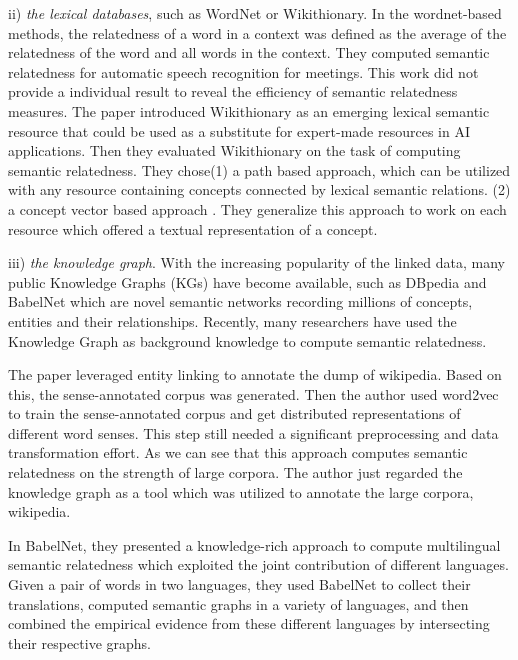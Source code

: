 ii) \emph{the lexical databases}, such as WordNet or Wikithionary. 
In the wordnet-based methods\cite{acl/Pucher07}, the relatedness of a word in a context was
defined as the average of the relatedness of the word and all words in the context. They computed
semantic relatedness for automatic speech recognition for meetings. This work did not provide a individual result
to reveal the efficiency of semantic relatedness measures.
The paper \cite{aaai/ZeschMG08} introduced Wikithionary as an emerging lexical semantic resource
that could be used as a substitute for expert-made resources in AI applications.
Then they evaluated Wikithionary on the task of computing semantic relatedness.
They chose(1) a path based approach\cite{its/Rada89}, which can be utilized with any
resource containing concepts connected by lexical semantic relations. (2) a concept vector based approach
\cite{ijcai/GabrilovichM07}. They generalize this approach to work on each
resource which offered a textual representation of a concept.

iii) \emph{the knowledge graph}. 
With the increasing popularity of the linked data, many public Knowledge Graphs (KGs) have
become available, such as DBpedia and BabelNet which are novel semantic networks recording millions
of concepts, entities and their relationships. Recently, many researchers have used the Knowledge Graph as
background knowledge to compute semantic relatedness. 

The paper\cite{acl/IacobacciPN15} leveraged entity linking to annotate the dump of wikipedia. Based on this,
the sense-annotated corpus was generated. Then the author used word2vec to
train the sense-annotated corpus and get distributed representations of different 
word senses. This step still needed a significant preprocessing and data transformation effort. 
As we can see that this approach computes semantic relatedness on the strength of large corpora.
The author just regarded the knowledge graph as a tool which was utilized to annotate the large corpora, wikipedia.  

In BabelNet\cite{aaai/NavigliP12}, they presented a knowledge-rich approach to compute multilingual semantic
relatedness which exploited the joint contribution of different languages. Given a pair of words 
in two languages, they used BabelNet to collect their translations, computed semantic
graphs in a variety of languages, and then combined the empirical evidence from these 
different languages by intersecting their respective graphs.

